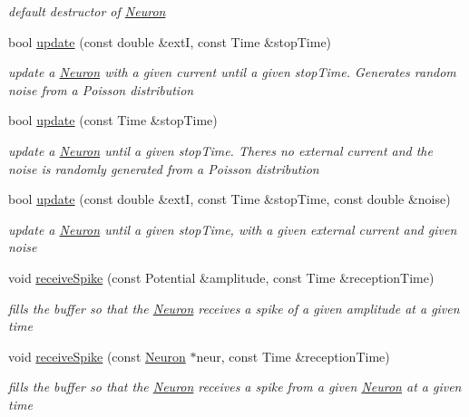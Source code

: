 \begin{DoxyCompactItemize}
\begin{DoxyCompactList}\small\item\em default destructor of \hyperlink{classNeuron}{Neuron} \end{DoxyCompactList}\item 
bool \hyperlink{classNeuron_a9692066fbcd0d632246970c627784341}{update} (const double \&extI, const Time \&stop\+Time)
\begin{DoxyCompactList}\small\item\em update a \hyperlink{classNeuron}{Neuron} with a given current until a given stop\+Time. Generates random noise from a Poisson distribution \end{DoxyCompactList}\item 
bool \hyperlink{classNeuron_ae2e3e2ebf571a295c2858ee48efbecce}{update} (const Time \&stop\+Time)
\begin{DoxyCompactList}\small\item\em update a \hyperlink{classNeuron}{Neuron} until a given stop\+Time. There\textquotesingle{}s no external current and the noise is randomly generated from a Poisson distribution \end{DoxyCompactList}\item 
bool \hyperlink{classNeuron_aa21dce996e08173d864c9f4b0198a793}{update} (const double \&extI, const Time \&stop\+Time, const double \&noise)
\begin{DoxyCompactList}\small\item\em update a \hyperlink{classNeuron}{Neuron} until a given stop\+Time, with a given external current and given noise \end{DoxyCompactList}\item 
void \hyperlink{classNeuron_a8e54b7a86764bd1445f8a8105c3ba5e2}{receive\+Spike} (const Potential \&amplitude, const Time \&reception\+Time)
\begin{DoxyCompactList}\small\item\em fills the buffer so that the \hyperlink{classNeuron}{Neuron} receives a spike of a given amplitude at a given time \end{DoxyCompactList}\item 
void \hyperlink{classNeuron_a1994f85ad163be6ebbad5982bf614627}{receive\+Spike} (const \hyperlink{classNeuron}{Neuron} $\ast$neur, const Time \&reception\+Time)
\begin{DoxyCompactList}\small\item\em fills the buffer so that the \hyperlink{classNeuron}{Neuron} receives a spike from a given \hyperlink{classNeuron}{Neuron} at a given time \end{DoxyCompactList}\item 

\end{DoxyCompactItemize}
